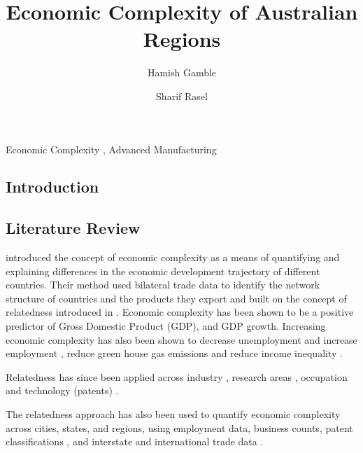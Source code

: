 \documentclass[
  number]{elsarticle}
\begin{document}
\begin{frontmatter}
\title{Economic Complexity of Australian Regions}
\author[1]{Hamish Gamble%
%
}
\author[1]{Sharif Rasel%
%
}





        





\begin{keyword}
    Economic Complexity \sep 
    Advanced Manufacturing
\end{keyword}
\end{frontmatter}
    

\subsection{Introduction}\label{introduction}

\subsection{Literature Review}\label{literature-review}

\citep{hidalgo2009} introduced the concept of economic complexity as a
means of quantifying and explaining differences in the economic
development trajectory of different countries. Their method used
bilateral trade data to identify the network structure of countries and
the products they export and built on the concept of relatedness
introduced in \citep{hidalgo2007}. Economic complexity has been shown to
be a positive predictor of Gross Domestic Product (GDP), and GDP growth.
Increasing economic complexity has also been shown to decrease
unemployment and increase employment \citep{adam2023}, reduce green
house gas emissions \citep{romero2021} and reduce income inequality
\citep{hartmann2017}.

Relatedness has since been applied across industry \citep{neffke2012},
research areas \citep{guevara2016}, occupation \citep{muneepeerakul2013}
and technology (patents) \citep{kogler2013}.

The relatedness approach has also been used to quantify economic
complexity across cities, states, and regions, using employment
data\citep[\citep{ecnz}, \citep{ecmexico}]{ecus}, business
counts\citep{ecchina}, patent classifications \citep{balland2021}, and
interstate and international trade data \citep{ecaus}.
\end{document}
